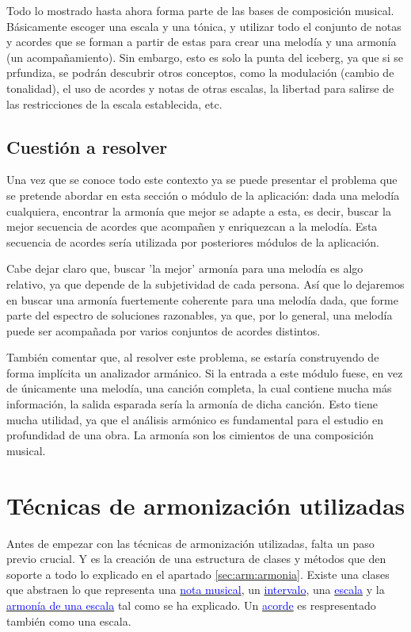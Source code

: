     Todo lo mostrado hasta ahora forma parte de las bases de composición musical. Básicamente escoger una escala y una tónica, y utilizar todo el conjunto de notas y acordes que se forman a partir de estas para crear una melodía y una armonía (un acompañamiento). Sin embargo, esto es solo la punta del iceberg, ya que si se prfundiza, se podrán descubrir otros conceptos, como la modulación (cambio de tonalidad), el uso de acordes y notas de otras escalas, la libertad para salirse de las restricciones de la escala establecida, etc. 

\subsection{Cuestión a resolver}     

    Una vez que se conoce todo este contexto ya se puede presentar el problema que se pretende abordar en esta sección o módulo de la aplicación: dada una melodía cualquiera, encontrar la armonía que mejor se adapte a esta, es decir, buscar la mejor secuencia de acordes que acompañen y enriquezcan a la melodía. Esta secuencia de acordes sería utilizada por posteriores módulos de la aplicación.

    Cabe dejar claro que, buscar 'la mejor' armonía para una melodía es algo relativo, ya que depende de la subjetividad de cada persona. Así que lo dejaremos en buscar una armonía fuertemente coherente para una melodía dada, que forme parte del espectro de soluciones razonables, ya que, por lo general, una melodía puede ser acompañada por varios conjuntos de acordes distintos.

    También comentar que, al resolver este problema, se estaría construyendo de forma implícita un analizador armánico. Si la entrada a este módulo fuese, en vez de únicamente una melodía, una canción completa, la cual contiene mucha más información, la salida esparada sería la armonía de dicha canción. Esto tiene mucha utilidad, ya que el análisis armónico es fundamental para el estudio en profundidad de una obra. La armonía son los cimientos de una composición musical. 

    \section{Técnicas de armonización utilizadas}

    Antes de empezar con las técnicas de armonización utilizadas, falta un paso previo crucial. Y es la creación de una estructura de clases y métodos que den soporte a todo lo explicado en el apartado \ref{sec:arm:armonia}. Existe una clases que abstraen lo que representa una \hyperref[arm:notas_musicales]{\textcolor{blue}{nota musical}}, un \hyperref[sec:arm:intervalos]{\textcolor{blue}{intervalo}}, una \hyperref[sec:arm:escalas]{\textcolor{blue}{escala}} y la \hyperref[arm:armonia_escala]{\textcolor{blue}{armonía de una escala}} tal como se ha explicado. Un \hyperref[sec:arm:acordes]{\textcolor{blue}{acorde}} es respresentado también como una escala. 
    
